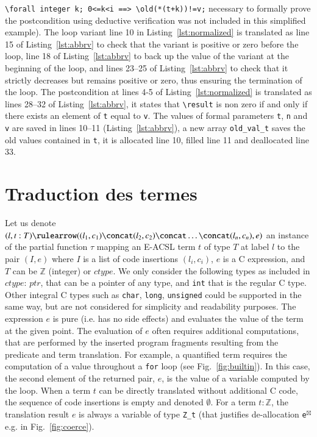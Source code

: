 \lstinline|\forall integer k; 0<=k<i ==> \old(*(t+k))!=v;|
necessary to formally prove the postcondition using deductive verification
was not included in this simplified example).
The loop variant line 10 in Listing~\ref{lst:normalized} is translated as
line 15 of Listing~\ref{lst:abbrv} to check that the variant is positive or
zero before the loop, line 18 of Listing~\ref{lst:abbrv} to back up the
value of the variant at the beginning of the loop, and lines 23--25 of
Listing~\ref{lst:abbrv} to check that it strictly decreases but remains positive
or zero, thus ensuring the termination of the loop.
The postcondition at lines 4-5 of Listing~\ref{lst:normalized} is translated as
lines 28--32 of Listing~\ref{lst:abbrv}, it states that \lstinline|\result| is
non zero if and only if there exists an element of \lstinline|t| equal
to \lstinline|v|.
The values of formal parameters \lstinline|t|, \lstinline|n| and
\lstinline|v|
are saved in lines 10--11
(Listing~\ref{lst:abbrv}), a new array \lstinline|old_val_t| saves the old values
contained in \lstinline|t|, it is allocated line 10, filled line 11 and
deallocated line 33.



\section{Traduction des termes \acsl}
\label{sec:term}

Let us denote
$(l, t:T) \rulearrow ((l_1, c_1) \concat (l_2, c_2) \concat \ldots \concat (l_n, c_n), e)$
an instance of the partial function $\tau$ mapping an E-ACSL term $t$ of type
$T$ at label $l$ to the pair $(I, e)$ where $I$ is a list of code insertions
$(l_i, c_i)$, $e$ is a C expression, and $T$ can be $\mathbb{Z}$ (integer) or
$ctype$. We only consider
the following types as included in $ctype$: $ptr$,
that can be a pointer of any type, and \lstinline'int' that is the regular C
type. Other integral C types such as \lstinline'char', \lstinline'long',
\lstinline'unsigned' could be supported in the same way, but are not considered
for simplicity and readability purposes.
The expression $e$ is pure (i.e. has no side
effects) and evaluates the value of the term at the given point.
The evaluation of $e$ often requires additional
computations, that are performed by the inserted program fragments
resulting from the predicate and term translation. For example, a quantified
term requires the computation of a value throughout a \lstinline|for| loop
(see Fig.~\ref{fig:builtin}). In this case, the second element of the returned
pair, $e$, is the value of a variable computed by the loop.
When a term $t$ can be directly translated without additional C code, 
the sequence of code insertions is empty and denoted $\emptyset$.
For a term $t:\mathbb{Z}$,
the translation result $e$ is always a variable of type \lstinline'Z_t'
(that justifies de-allocation \lstinline{e}${}^{\boxtimes}$ e.g. in Fig.~\ref{fig:coerce}).



